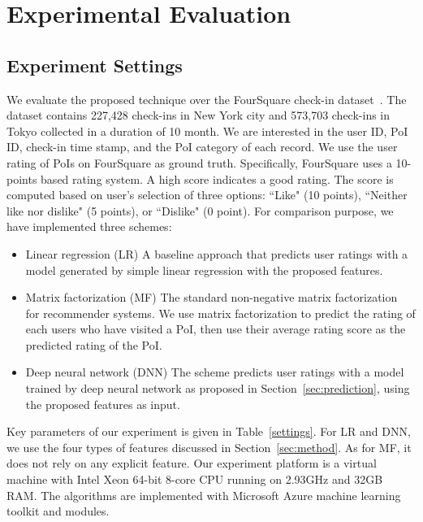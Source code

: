 \section{Experimental Evaluation}\label{sec:exp}

\subsection{Experiment Settings}

We evaluate the proposed technique over the FourSquare check-in dataset~\cite{yang2014modeling}. The dataset contains 227,428 check-ins in New York city and 573,703 check-ins in Tokyo collected in a duration of 10 month. We are interested in the user ID, PoI ID, check-in time stamp, and the PoI category of each record. We use the user rating of PoIs on FourSquare as ground truth. Specifically, FourSquare uses a 10-points based rating system. A high score indicates a good rating. The score is computed based on user's selection of three options: ``Like" (10 points), ``Neither like nor dislike" (5 points), or ``Dislike" (0 point). For comparison purpose, we have implemented three schemes:
\begin{itemize}
\item{Linear regression (LR)} A baseline approach that predicts user ratings with a model generated by simple linear regression with the proposed features.
\item{Matrix factorization (MF)} The standard non-negative matrix factorization~\cite{koren2009matrix} for recommender systems. We use matrix factorization to predict the rating of each users who have visited a PoI, then use their average rating score as the predicted rating of the PoI.
\item{Deep neural network (DNN)} The scheme predicts user ratings with a model trained by deep neural network as proposed in Section~\ref{sec:prediction}, using the proposed features as input.
\end{itemize}

Key parameters of our experiment is given in Table~\ref{settings}. For LR and DNN, we use the four types of features discussed in Section~\ref{sec:method}. As for MF, it does not rely on any explicit feature. Our experiment platform is a virtual machine with Intel Xeon 64-bit 8-core CPU running on 2.93GHz and 32GB RAM. The algorithms are implemented with Microsoft Azure machine learning toolkit and modules. 

